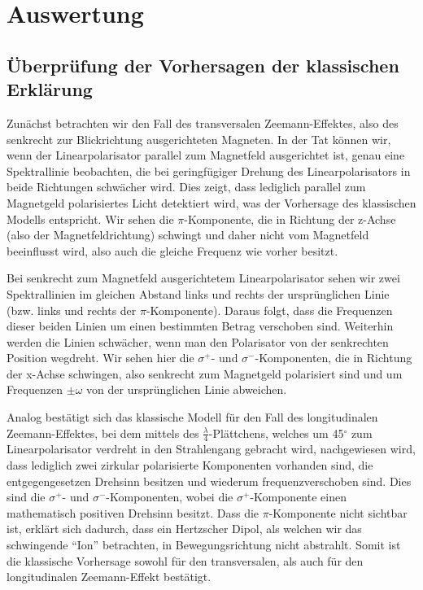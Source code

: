 \documentclass[bigchapter,colorback,accentcolor=tud4b,linedtoc,11pt]{tudreport}
\begin{document}
\chapter{Auswertung}
\section{Überprüfung der Vorhersagen der klassischen Erklärung}

Zunächst betrachten wir den Fall des transversalen Zeemann-Effektes, also des senkrecht zur Blickrichtung ausgerichteten Magneten. In der Tat können wir, wenn der Linearpolarisator parallel zum Magnetfeld ausgerichtet ist, genau eine Spektrallinie beobachten, die bei geringfügiger Drehung des Linearpolarisators in beide Richtungen schwächer wird. Dies zeigt, dass lediglich parallel zum Magnetgeld polarisiertes Licht detektiert wird, was der Vorhersage des klassischen Modells entspricht. Wir sehen die $\pi$-Komponente, die in Richtung der z-Achse (also der Magnetfeldrichtung) schwingt und daher nicht vom Magnetfeld beeinflusst wird, also auch die gleiche Frequenz wie vorher besitzt.

Bei senkrecht zum Magnetfeld ausgerichtetem Linearpolarisator sehen wir zwei Spektrallinien im gleichen Abstand links und rechts der ursprünglichen Linie (bzw. links und rechts der $\pi$-Komponente). Daraus folgt, dass die Frequenzen dieser beiden Linien um einen bestimmten Betrag verschoben sind. Weiterhin werden die Linien schwächer, wenn man den Polarisator von der senkrechten Position wegdreht. Wir sehen hier die $\sigma^+$- und $\sigma^-$-Komponenten, die in Richtung der x-Achse schwingen, also senkrecht zum Magnetgeld polarisiert sind und um Frequenzen $\pm \omega$ von der ursprünglichen Linie abweichen.

Analog bestätigt sich das klassische Modell für den Fall des longitudinalen Zeemann-Effektes, bei dem mittels des $\frac{\lambda}{4}$-Plättchens, welches um 45$^{\circ}$ zum Linearpolarisator verdreht in den Strahlengang gebracht wird, nachgewiesen wird, dass lediglich zwei zirkular polarisierte Komponenten vorhanden sind, die entgegengesetzen Drehsinn besitzen und wiederum frequenzverschoben sind. Dies sind die $\sigma^+$- und $\sigma^-$-Komponenten, wobei die $\sigma^+$-Komponente einen mathematisch positiven Drehsinn besitzt. Dass die $\pi$-Komponente nicht sichtbar ist, erklärt sich dadurch, dass ein Hertzscher Dipol, als welchen wir das schwingende "`Ion"' betrachten, in Bewegungsrichtung nicht abstrahlt. Somit ist die klassische Vorhersage sowohl für den transversalen, als auch für den longitudinalen Zeemann-Effekt bestätigt.
\end{document}
